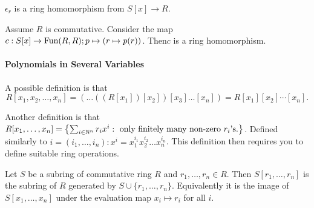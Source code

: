 \begin{proposition}
    \(\epsilon_r\) is a ring homomorphism from \(S[x] \to R\).
\end{proposition}

\begin{corollary}
    Assume \(R\) is commutative. Consider the map \(c: S[x] \to \operatorname{Fun}(R, R); p \mapsto (r \mapsto p(r))\). Then\(c\) is a ring homomorphism.
\end{corollary}


\paragraph{Polynomials in Several Variables}
A possible definition is that \[R[x_1, x_2, \dots, x_n] = (\dots ((R[x_1])[x_2])[x_3] \dots [x_n]) = R[x_1][x_2] \cdots[x_n].\]

Another definition is that \(R[x_1, \dots, x_n] = \left\{ \sum_{i \in \mathbb{N}^n} r_i x^i : \text{ only finitely many non-zero } r_i\text{'s}. \right\}\). Defined similarly to \(i = (i_1, \dots, i_n) : x^i = x_1^{i_1} x_2^{i_2} \dots x_n^{i_n}\). This definition then requires you to define suitable ring operations.

\begin{prop-defn}
    Let \(S\) be a subring of commutative ring \(R\) and \(r_1, \dots, r_n \in R\). Then \(S[r_1, \dots, r_n]\) is the subring of \(R\) generated by \(S \cup \{r_1, \dots, r_n\}\). Equivalently it is the image of \(S[x_1, \dots, x_n]\) under the evaluation map \(x_i \mapsto r_i\) for all \(i\).
\end{prop-defn}


